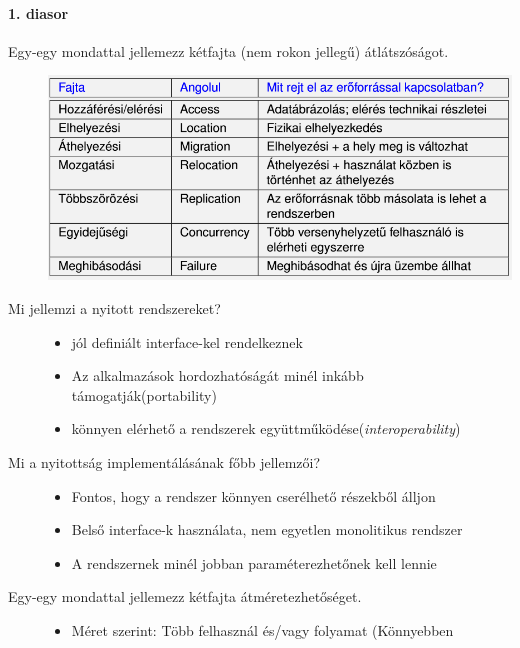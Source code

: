 \documentclass[twoside, a4paper, 12pt]{article}
\begin{document}
    \paragraph{1. diasor}
    \begin{description}
        \item[Egy-egy mondattal jellemezz kétfajta (nem rokon jellegű)
            átlátszóságot.]
            \hfill
            \includegraphics[scale=0.5]{images/P5.PNG}
        \item[Mi jellemzi a nyitott rendszereket?]
            \hfill
            \begin{itemize}
                \item jól definiált interface-kel rendelkeznek 
                \item Az alkalmazások hordozhatóságát minél inkább
                    támogatják(portability)
                \item könnyen elérhető a rendszerek
                    együttműködése(\textit{interoperability})
            \end{itemize}
        \item[Mi a nyitottság implementálásának főbb jellemzői?]
            \hfill
            \begin{itemize}
                \item Fontos, hogy a rendszer könnyen cserélhető részekből álljon
                \item Belső interface-k használata, nem egyetlen monolitikus
                    rendszer
                \item A rendszernek minél jobban paraméterezhetőnek kell lennie
            \end{itemize}
        \item[Egy-egy mondattal jellemezz kétfajta átméretezhetőséget.]
            \hfill
            \begin{itemize}
                \item Méret szerint: Több felhasznál és/vagy folyamat  (Könnyebben

\end{itemize}
\end{description}
\end{document}
